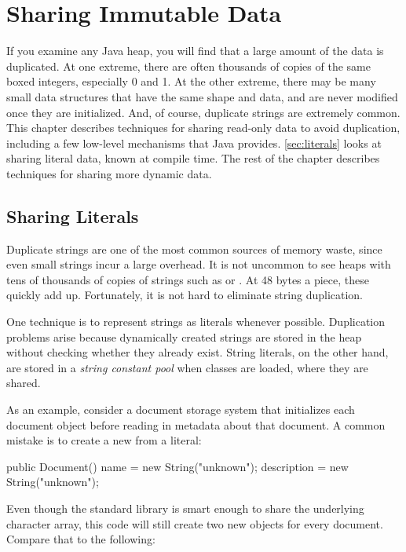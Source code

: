 \chapter{Sharing Immutable Data}
\label{chapter:sharing-immutable-data}

If you examine any Java
heap, you will find that a
large amount of the data is duplicated. At one extreme, 
there are often thousands of copies of the same boxed
integers, especially 0 and 1. At the other extreme, there may be many
small data structures that have the same shape and data, and are never modified
once they are initialized. And, of course, duplicate strings are extremely common.
This chapter describes
techniques for sharing read-only data to avoid
duplication, including a few low-level mechanisms that Java provides.
\autoref{sec:literals} looks at sharing literal data, known at compile time. 
The rest of the chapter describes techniques for sharing more
dynamic data.

\section{Sharing Literals}
\label{sec:literals}

Duplicate strings are one of the
most common sources of memory waste, since even
small strings incur a large overhead. It is not uncommon to
see heaps with tens of thousands of copies of strings such as  or
. At 48 bytes a piece, these quickly add up.
Fortunately, it is not hard to eliminate string duplication.

One technique is to represent strings as  
literals whenever possible. Duplication problems arise because dynamically
 created strings
are stored in the heap without checking whether they already
exist. String literals, on the other hand, are stored in a
\emph{string constant pool} when classes
are loaded, where they are shared.

As an example, consider a document storage system that initializes each document
object before reading in metadata about that document.  A common
mistake is to create a new  from a  literal:

\begin{shortlisting}
	public Document() {
		name = new String("unknown");
		description = new String("unknown");
	}
\end{shortlisting}

Even though the standard library is smart enough to share the
underlying character array, 
this code will still create two new 
objects for every document. 
Compare that to the following:


